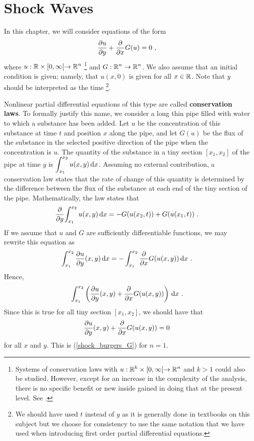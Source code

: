 \chapter{Shock Waves} \label{ChapShock}

In this chapter, we will consider equations of the form
\begin{equation}\label{shock_burgers_G}
\pdydx{u}{y} + \pdfdx{G(u)}{x} = 0 \ ,
\end{equation}
where $\DS u:\RR\times [0,\infty[ \to \RR^n$
\footnote{Systems of conservation laws with
$\DS u:\RR^k\times[0,\infty[ \to \RR^n$ and $k>1$ could also
be studied.  However, except for an increase in the complexity of the
analysis, there is no specific benefit or new inside gained in doing
that at the present level.  See \cite{Lax}.} and
$\DS G:\RR^n \to \RR^n$. We
also assume that an initial condition is given; namely, that $u(x,0)$
is given for all $x\in \RR$.  Note that $y$ should be interpreted as
the time \footnote{We should have used $t$ instead of $y$ as it is
generally done in textbooks on this subject but we choose for
consistency to use the same notation that we have used when
introducing first order partial differential equations.}.

Nonlinear partial differential equations of this type are called
{\bfseries conservation laws}.  To formally
justify this name, we consider a long thin pipe filled with water
to which a substance has been added.  Let $u$ be the concentration of
this substance at time $t$ and position $x$ along the pipe, and let
$G(u)$ be the flux of the substance in the selected positive direction
of the pipe when the concentration is $u$.  The quantity of the
substance in a tiny section $[x_1,x_2]$ of the pipe at time $y$ is
$\DS \int_{x_1}^{x_2} u(x,y) \dx{x}$.
Assuming no external contribution, a conservation law states that the
rate of change of this quantity is determined by the difference
between the flux of the substance at each end of the tiny section of
the pipe.  Mathematically, the law states that
\[
\pdfdx{ \int_{x_1}^{x_2} u(x,y) \dx{x} }{y}
= -G(u(x_2,t)) + G(u(x_1,t)) \ .
\]
If we assume that $u$ and $G$ are sufficiently differentiable
functions, we may rewrite this equation as
\[
\int_{x_1}^{x_2} \pdydx{u}{y}(x,y) \dx{x}
= - \int_{x_1}^{x_2} \pdfdx{G(u(x,y))}{x} \dx{x} \ .
\]
Hence,
\[
\int_{x_1}^{x_2} \left( \pdydx{u}{y}(x,y) + \pdfdx{G(u(x,y))}{x}
\right) \dx{x} \ .
\]
Since this is true for all tiny section $[x_1,x_2]$, we should have
that
\[
  \pdydx{u}{y}(x,y) + \pdfdx{G(u(x,y))}{x} = 0
\]
for all $x$ and $y$.  This is (\ref{shock_burgers_G}) for $n=1$.

